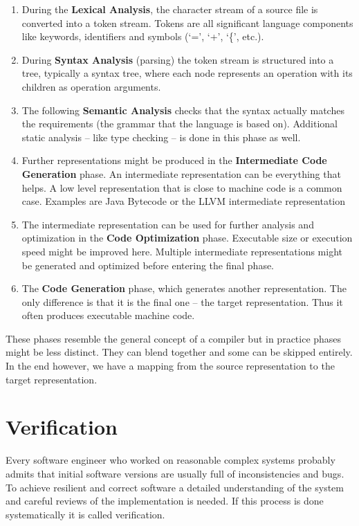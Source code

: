 \begin{enumerate}
  \item During the \textbf{Lexical Analysis}, the character stream of a source file is converted into a token stream.
  Tokens are all significant language components like keywords, identifiers and symbols (`=', `+', `\{', etc.).
  \item During \textbf{Syntax Analysis} (parsing) the token stream is structured into a tree,
  typically a syntax tree, where each node represents an operation with its children as operation arguments.
  \item The following \textbf{Semantic Analysis} checks that the syntax actually matches the requirements (the grammar that the language is based on).\newline
  Additional static analysis -- like type checking -- is done in this phase as well.
  \item Further representations might be produced in the \textbf{Intermediate Code Generation} phase.
  An intermediate representation can be everything that helps.
  A low level representation that is close to machine code is a common case.
  Examples are Java Bytecode or the LLVM intermediate representation
  \item The intermediate representation can be used for further analysis and optimization in the \textbf{Code Optimization} phase.
  Executable size or execution speed might be improved here.
  Multiple intermediate representations might be generated and optimized before entering the final phase.
  \item The \textbf{Code Generation} phase, which generates another representation.
  The only difference is that it is the final one -- the target representation.
  Thus it often produces executable machine code.
\end{enumerate}

These phases resemble the general concept of a compiler but in practice phases might be less distinct.
They can blend together and some can be skipped entirely.
In the end however, we have a mapping from the source representation to the target representation.

\section{Verification}
\label{rel_mc}
Every software engineer who worked on reasonable complex systems probably admits that initial software versions are usually full of inconsistencies and bugs.
To achieve resilient and correct software a detailed understanding of the system and careful reviews of the implementation is needed.
If this process is done systematically it is called verification.

